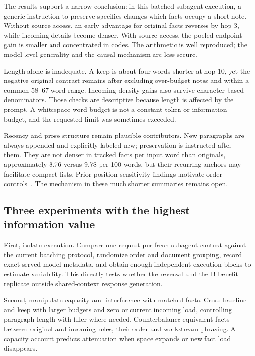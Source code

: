 \documentclass[10pt,letterpaper]{amsart}
\numberwithin{equation}{section}
\begin{document}
The results support a narrow conclusion: in this batched subagent execution, a generic
instruction to preserve specifics changes which facts occupy a short note. Without source
access, an early advantage for original facts reverses by hop 3, while incoming details
become denser. With source access, the pooled endpoint gain is smaller and concentrated in
codes. The arithmetic is well reproduced; the model-level generality and the causal
mechanism are less secure.

Length alone is inadequate. A-keep is about four words shorter at hop 10, yet the negative
original contrast remains after excluding over-budget notes and within a common
58--67-word range. Incoming density gains also survive character-based denominators. Those
checks are descriptive because length is affected by the prompt. A whitespace word budget
is not a constant token or information budget, and the requested limit was sometimes
exceeded.

Recency and prose structure remain plausible contributors. New paragraphs are always
appended and explicitly labeled new; preservation is instructed after them. They are not
denser in tracked facts per input word than originals, approximately 8.76 versus 9.78 per
100 words, but their recurring anchors may facilitate compact lists. Prior
position-sensitivity findings motivate order controls~\cite{liuEtAl2024}. The mechanism in
these much shorter summaries remains open.

\subsection*{Three experiments with the highest information value}

First, isolate execution. Compare one request per fresh subagent context against the
current batching protocol, randomize order and document grouping, record exact
served-model metadata, and obtain enough independent execution blocks to estimate
variability. This directly tests whether the reversal and the B benefit replicate outside
shared-context response generation.

Second, manipulate capacity and interference with matched facts. Cross baseline and keep
with larger budgets and zero or current incoming load, controlling paragraph length with
filler where needed. Counterbalance equivalent facts between original and incoming roles,
their order and workstream phrasing. A capacity account predicts attenuation when space
expands or new fact load disappears.
\end{document}
